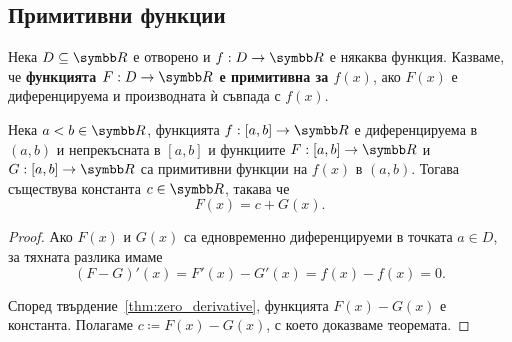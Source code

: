 \documentclass[numbers=endperiod, bibliography=totocnumbered]{scrartcl}
\begin{document}
\subsection{Примитивни функции}

\begin{definition}
  Нека \( D \subseteq \R \) е отворено и \( f: D \to \R \) е някаква функция. Казваме, че \textbf{функцията \( F: D \to \R \) е примитивна за \( f(x) \)}, ако \( F(x) \) е диференцируема и производната ѝ съвпада с \( f(x) \).
\end{definition}

\begin{theorem}
Нека \( a < b \in \R \), функцията \( f: [a, b] \to \R \) е диференцируема в \( (a, b) \) и непрекъсната в \( [a, b] \) и функциите \( F: [a, b] \to \R \) и \( G: [a, b] \to \R \) са примитивни функции на \( f(x) \) в \( (a, b) \). Тогава съществува константа \( c \in \R \), такава че
  \begin{equation*}
    F(x) = c + G(x).
  \end{equation*}
\end{theorem}
\begin{proof}
  Ако \( F(x) \) и \( G(x) \) са едновременно диференцируеми в точката \( a \in D \), за тяхната разлика имаме
  \begin{equation*}
    (F - G)'(x)
    =
    F'(x) - G'(x)
    =
    f(x) - f(x)
    =
    0.
  \end{equation*}

  Според твърдение~\ref{thm:zero_derivative}, функцията \( F(x) - G(x) \) е константа. Полагаме \( c \coloneqq F(x) - G(x) \), с което доказваме теоремата.
\end{proof}

\printbibliography
\end{document}
